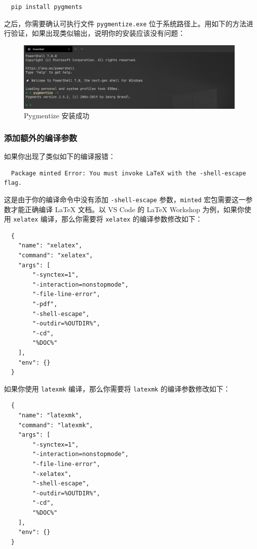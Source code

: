 \begin{verbatim}
  pip install pygments
\end{verbatim}

之后，你需要确认可执行文件 \texttt{pygmentize.exe} 位于系统路径上。用如下的方法进行验证，如果出现类似输出，说明你的安装应该没有问题：

\begin{figure}[H]
  \centering
  \includegraphics[width=\textwidth]{images/pygmentize_test.png}
  \caption{Pygmentize 安装成功}
  \label{pygmentize_test}
\end{figure}

\subsubsection{添加额外的编译参数}

如果你出现了类似如下的编译报错：

\begin{verbatim}
  Package minted Error: You must invoke LaTeX with the -shell-escape flag.
\end{verbatim}

这是由于你的编译命令中没有添加 \texttt{-shell-escape} 参数，\texttt{minted} 宏包需要这一参数才能正确编译 {\LaTeX} 文档。以 VS Code 的 {\LaTeX} Workshop 为例，如果你使用 \texttt{xelatex} 编译，那么你需要将 \texttt{xelatex} 的编译参数修改如下：

\begin{verbatim}
  {
    "name": "xelatex",
    "command": "xelatex",
    "args": [
        "-synctex=1",
        "-interaction=nonstopmode",
        "-file-line-error",
        "-pdf",
        "-shell-escape",
        "-outdir=%OUTDIR%",
        "-cd",
        "%DOC%"
    ],
    "env": {}
  }
\end{verbatim}

如果你使用 \texttt{latexmk} 编译，那么你需要将 \texttt{latexmk} 的编译参数修改如下：

\begin{verbatim}
  {
    "name": "latexmk",
    "command": "latexmk",
    "args": [
        "-synctex=1",
        "-interaction=nonstopmode",
        "-file-line-error",
        "-xelatex",
        "-shell-escape",
        "-outdir=%OUTDIR%",
        "-cd",
        "%DOC%"
    ],
    "env": {}
  }
\end{verbatim}

